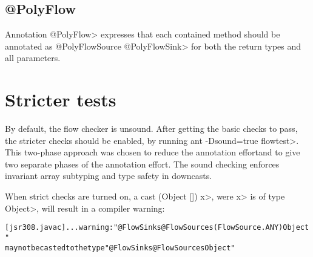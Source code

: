 \subsection{@PolyFlow\label{sec:polyflow}}

Annotation \<@PolyFlow> expresses that each contained method should be
annotated as \<@PolyFlowSource @PolyFlowSink> for both the return
types and all parameters.



%
%
%




\section{Stricter tests\label{sec:stricter}}

By default, the flow checker is unsound.  After getting the basic checks to pass, the
 stricter checks should be enabled, by running \<ant -Dsound=true flowtest>.
This two-phase approach was chosen to reduce
the annotation effortand to give two separate phases of
the annotation effort.
 The sound checking enforces invariant 
array subtyping and type safety in downcasts.


When strict checks are turned on,
a cast \<(Object []) x>, were \<x> is of type \<Object>, will result
in a compiler warning:

\begin{alltt}
[jsr308.javac] ... warning: "@FlowSinks @FlowSources({FlowSource.ANY}) Object"
       may not be casted to the type "@FlowSinks @FlowSources Object"
\end{alltt}


